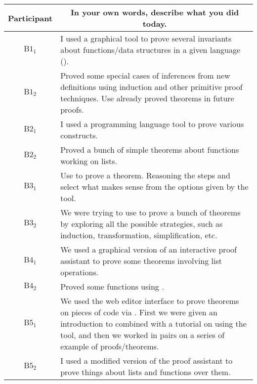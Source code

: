\noindent
\begin{tabularx}{\linewidth}{@{}cX@{}}
  \toprule
  Participant & \multicolumn{1}{c}{
    \textbf{In your own words, describe what you did today.}
  } \\ \midrule
  $\text{B}1_{1}$ & I used a graphical tool to prove several invariants about functions/data structures in a given language (\Coq{}). \\
  $\text{B}1_{2}$ & Proved some special cases of inferences from new definitions using induction and other primitive proof techniques.  Use already proved theorems in future proofs. \\
  $\text{B}2_{1}$ & I used a programming language tool to prove various constructs. \\
  $\text{B}2_{2}$ & Proved a bunch of simple theorems about functions working on lists. \\
  $\text{B}3_{1}$ & Use \Coq{} to prove a theorem.  Reasoning the steps and select what makes sense from the options given by the tool. \\
  $\text{B}3_{2}$ & We were trying to use \PeaCoq{} to prove a bunch of theorems by exploring all the possible strategies, such as induction, transformation, simplification, etc. \\
  $\text{B}4_{1}$ & We used a graphical version of an interactive proof assistant to prove some theorems involving list operations. \\
  $\text{B}4_{2}$ & Proved some functions using \PeaCoq{}. \\
  $\text{B}5_{1}$ & We used the \PeaCoq{} web editor interface to prove theorems on pieces of code via \Coq{}.  First we were given an introduction to \Coq{} combined with a tutorial on using the tool, and then we worked in pairs on a series of example of proofs/theorems. \\
  $\text{B}5_{2}$ & I used a modified version of the \Coq{} proof assistant to prove things about lists and functions over them. \\
  \bottomrule
\end{tabularx}{\parfillskip=0pt\par}

\clearpage

